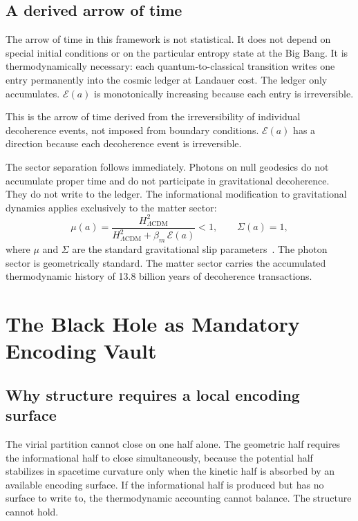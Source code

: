 \documentclass[12pt,a4paper]{article}
\begin{document}
\subsection{A derived arrow of time}

The arrow of time in this framework is not statistical. It does not depend
on special initial conditions or on the particular entropy state at the
Big Bang. It is thermodynamically necessary: each quantum-to-classical
transition writes one entry permanently into the cosmic ledger at Landauer
cost. The ledger only accumulates. $\mathcal{E}(a)$ is monotonically
increasing because each entry is irreversible.

This is the arrow of time derived from the irreversibility of individual
decoherence events, not imposed from boundary conditions. $\mathcal{E}(a)$ has
a direction because each decoherence event is irreversible.

The sector separation follows immediately. Photons on null geodesics do
not accumulate proper time and do not participate in gravitational
decoherence. They do not write to the ledger. The informational
modification to gravitational dynamics applies exclusively to the matter
sector:
\begin{equation}
\mu(a) = \frac{H^2_{\Lambda\mathrm{CDM}}}{H^2_{\Lambda\mathrm{CDM}}
+ \beta_m\,\mathcal{E}(a)} < 1, \qquad \Sigma(a) = 1,
\label{eq:sector}
\end{equation}
where $\mu$ and $\Sigma$ are the standard gravitational slip
parameters~\citep{Bertschinger2008}. The photon sector is geometrically
standard. The matter sector carries the accumulated thermodynamic history
of 13.8 billion years of decoherence transactions.

\section{The Black Hole as Mandatory Encoding Vault}
\label{sec:bh}

\subsection{Why structure requires a local encoding surface}

The virial partition cannot close on one half alone. The geometric half
requires the informational half to close simultaneously, because the
potential half stabilizes in spacetime curvature only when the kinetic
half is absorbed by an available encoding surface. If the informational
half is produced but has no surface to write to, the thermodynamic
accounting cannot balance. The structure cannot hold.
\end{document}
